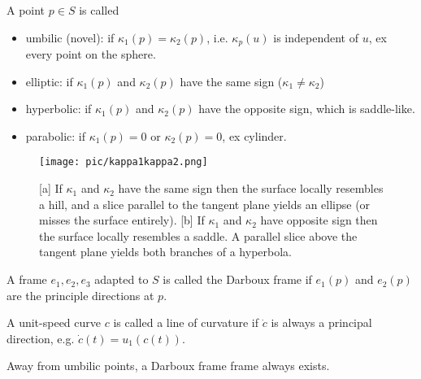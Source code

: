 \documentclass[10pt]{article}
\begin{document}
            \begin{definition}
                A point $p\in S$ is called
                \begin{itemize}[itemsep=-0.2mm]
                    \item umbilic (novel): if $\kappa_1(p) = \kappa_2(p)$, i.e. $\kappa_p(u)$ is independent of $u$, ex every point on the sphere.
                    \item elliptic: if $\kappa_1(p)$ and $\kappa_2(p)$ have the same sign ($\kappa_1\neq\kappa_2$)
                    \item hyperbolic: if $\kappa_1(p)$ and $\kappa_2(p)$ have the opposite sign, which is saddle-like.
                    \item parabolic: if $\kappa_1(p) = 0$ or $\kappa_2(p) = 0$, ex cylinder.
                \end{itemize}
            \end{definition}
            \begin{figure}[H]
                \centering
                \texttt{[image: pic/kappa1kappa2.png]}
                \caption{[a] If $\kappa_1$ and $\kappa_2$ have the same sign then the surface locally resembles a hill, and a slice parallel to the tangent plane yields an ellipse (or misses the surface entirely). [b] If $\kappa_1$ and $\kappa_2$ have opposite sign then the surface locally resembles a saddle. A parallel slice above the tangent plane yields both branches of a hyperbola.}
            \end{figure}
            \begin{definition}
                A frame $e_1, e_2, e_3$ adapted to $S$ is called the Darboux frame if $e_1(p)$ and $e_2(p)$ are the principle directions at $p$.
            \end{definition}
            \begin{definition}
                A unit-speed curve $c$ is called a line of curvature if $\dot{c}$ is always a principal direction, e.g. $\dot{c}(t) = u_1(c(t))$.
            \end{definition}
            \begin{theorem}
                Away from umbilic points, a Darboux frame frame always exists.
            \end{theorem}
\end{document}
